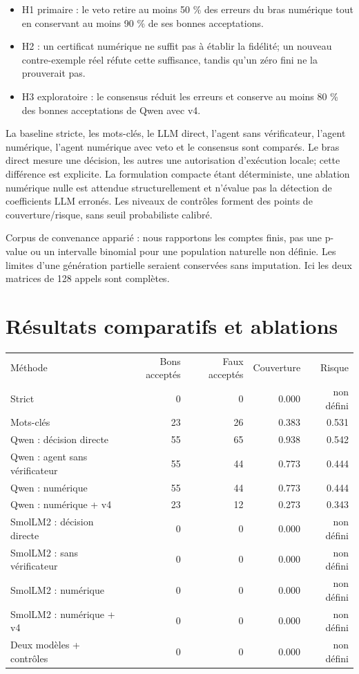 \documentclass[11pt]{article}
\begin{document}
\begin{itemize}
\item H1 primaire : le veto retire au moins 50 \% des erreurs du bras numérique tout en conservant au moins 90 \% de ses bonnes acceptations.
\item H2 : un certificat numérique ne suffit pas à établir la fidélité; un nouveau contre-exemple réel réfute cette suffisance, tandis qu'un zéro fini ne la prouverait pas.
\item H3 exploratoire : le consensus réduit les erreurs et conserve au moins 80 \% des bonnes acceptations de Qwen avec v4.
\end{itemize}

La baseline stricte, les mots-clés, le LLM direct, l'agent sans vérificateur, l'agent numérique, l'agent numérique avec veto et le consensus sont comparés. Le bras direct mesure une décision, les autres une autorisation d'exécution locale; cette différence est explicite. La formulation compacte étant déterministe, une ablation numérique nulle est attendue structurellement et n'évalue pas la détection de coefficients LLM erronés. Les niveaux de contrôles forment des points de couverture/risque, sans seuil probabiliste calibré.

Corpus de convenance apparié : nous rapportons les comptes finis, pas une p-value ou un intervalle binomial pour une population naturelle non définie. Les limites d'une génération partielle seraient conservées sans imputation. Ici les deux matrices de 128 appels sont complètes.

\section{Résultats comparatifs et ablations}

\begin{center}\small
\begin{tabularx}{\textwidth}{@{}Xrrrr@{}}
\hline
Méthode & Bons acceptés & Faux acceptés & Couverture & Risque\\
Strict & 0 & 0 & 0.000 & non défini\\
Mots-clés & 23 & 26 & 0.383 & 0.531\\
Qwen : décision directe & 55 & 65 & 0.938 & 0.542\\
Qwen : agent sans vérificateur & 55 & 44 & 0.773 & 0.444\\
Qwen : numérique & 55 & 44 & 0.773 & 0.444\\
Qwen : numérique + v4 & 23 & 12 & 0.273 & 0.343\\
SmolLM2 : décision directe & 0 & 0 & 0.000 & non défini\\
SmolLM2 : sans vérificateur & 0 & 0 & 0.000 & non défini\\
SmolLM2 : numérique & 0 & 0 & 0.000 & non défini\\
SmolLM2 : numérique + v4 & 0 & 0 & 0.000 & non défini\\
Deux modèles + contrôles & 0 & 0 & 0.000 & non défini\\
\hline
\end{tabularx}
\end{center}
\end{document}
